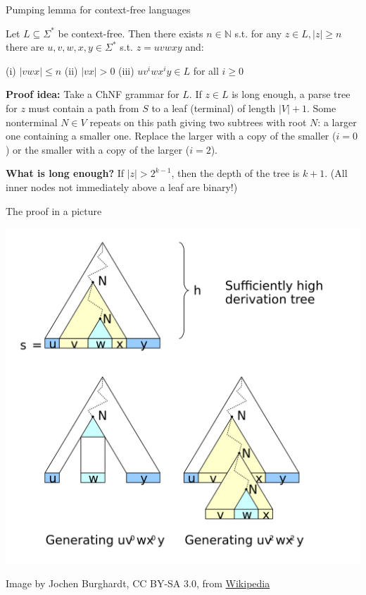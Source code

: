 \documentclass[handout]{beamer}
\begin{document}
\begin{frame}{Pumping lemma for context-free languages}

	\begin{theorem}
		Let $L\subseteq\Sigma^*$ be context-free. Then there exists $n\in\mathbb N$ s.t. for any $z\in L, |z|\geq n$ there are $u,v,w,x,y\in\Sigma^*$ s.t. $z=uvwxy$ and:
		
		(i) $|vwx|\leq n $ \hfill (ii) $|vx|>0$ \hfill (iii) $uv^iwx^iy\in L$ for all $i\geq 0$
	\end{theorem}

	\textbf{Proof idea:} Take a ChNF grammar for $L$. If $z\in L$ is long enough, a parse tree for $z$ must contain a path from $S$ to a leaf (terminal) of length $|V|+1$. Some nonterminal $N\in V$ repeats on this path giving two subtrees with root $N$: a larger one containing a smaller one. Replace the larger with a copy of the smaller ($i=0$) or the smaller with a copy of the larger ($i=2$).

	\textbf{What is long enough?} If $|z|>2^{k-1}$, then the depth of the tree is $k+1$. (All inner nodes not immediately above a leaf are binary!) 

\end{frame}


\begin{frame}{The proof in a picture}

	\vspace{-6pt}
	\begin{center}
		\includegraphics[height=0.92\textheight]{files/pumping-lemma-for-context-free-languages.png}
	\end{center}
	\vspace{-12pt}
	{\footnotesize Image by Jochen Burghardt, CC BY-SA 3.0, from \href{https://en.wikipedia.org/wiki/Pumping_lemma_for_context-free_languages}{Wikipedia}}
		
	
\end{frame}
\end{document}

